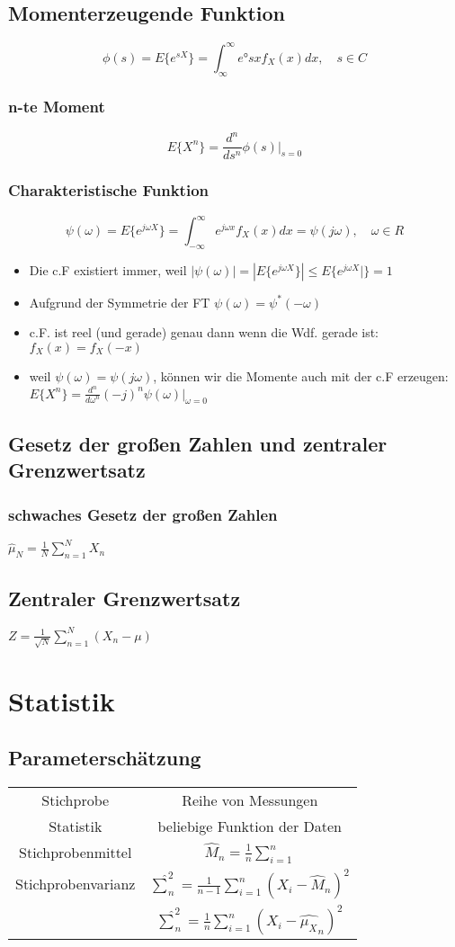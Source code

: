 \documentclass{article}
\begin{document}
\subsection{Momenterzeugende Funktion}
$$\phi(s) = E\{e^{sX}\} = \int_{\infty}^{\infty}e°{sx} f_X(x) dx,\quad s \in C $$
\subsubsection{n-te Moment}
$$E\{X^n\} = \frac{d^n}{ds^n} \phi(s)|_{s=0}$$
\subsubsection{Charakteristische Funktion}
$$\psi(\omega) = E\{e^{j\omega X}\} = \int_{-\infty}^{\infty} e^{j\omega x}f_X(x) dx =  \psi(j\omega), \quad \omega \in R$$
\begin {itemize}
\item  Die c.F existiert immer, weil $|\psi(\omega)| = |E\{ e^{j\omega X}\}| \le E\{e^{j\omega X}|\} = 1$
\item Aufgrund der Symmetrie der FT $\psi(\omega) = \psi^*(-\omega)$
\item c.F. ist reel (und gerade) genau dann wenn die Wdf. gerade ist: $f_X(x) = f_X(-x)$
\item weil $\psi(\omega) = \psi(j\omega)$, können wir die Momente auch mit der c.F erzeugen: $E\{X^n\} = \frac{d^n}{d\omega^n}(-j)^n\psi(\omega)|_{\omega = 0}$
\end{itemize}
\subsection{Gesetz der gro\ss en Zahlen und zentraler Grenzwertsatz}
\subsubsection{schwaches Gesetz der gro\ss en Zahlen}
$\hat{\mu}_N = \frac{1}{N} \sum_{n = 1}^N X_n$
\subsection{Zentraler Grenzwertsatz}
$Z = \frac{1}{\sqrt{N}}\sum_{n = 1}^N(X_n -\mu)$

\section {Statistik}
\subsection{Parameterschätzung}
\begin{tabular}{c c }
Stichprobe& Reihe von Messungen \\
Statistik & beliebige Funktion der Daten \\
Stichprobenmittel & $\hat{M}_n = \frac{1}{n} \sum_{i=1}^n$\\
Stichprobenvarianz & $\hat{\sum}_n^2 = \frac{1}{n-1} \sum_{i = 1}^n(X_i-\hat{M}_n)^2$ \\
		& $\hat{\sum}_n^2 = \frac{1}{n} \sum_{i = 1}^n(X_i-\hat{\mu_X}_n)^2$
\end{tabular}
\end{document}
